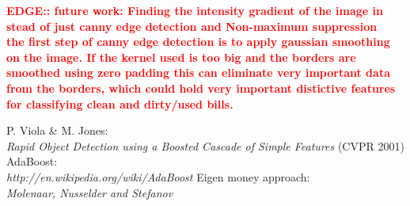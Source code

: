\documentclass[11pt,twocolumn]{article}
\newcommand{\todo}[1]{\textcolor{red}{\textbf{#1}}}
\newcommand{\tit}{\textit}
\begin{document}
		\todo{EDGE::  future work: Finding the intensity gradient of the image in
		stead of just canny edge detection and Non-maximum suppression\\
		the first step of canny edge detection is to apply gaussian smoothing on the
		image. If the kernel used is too big and the borders are smoothed using zero
		padding this can eliminate very important data from the borders, which could
		hold very important distictive features for classifying clean and dirty/used
		bills.}
		
		 
		\begin{thebibliography}{3} 
				P. Viola \& M. Jones:\\
				\tit{Rapid Object Detection using a Boosted Cascade of Simple Features}
				(CVPR 2001)
				AdaBoost: \\
				\tit{http://en.wikipedia.org/wiki/AdaBoost}	
			Eigen money approach: \\
				\tit{Molenaar, Nusselder and Stefanov}	
		\end{thebibliography}
\end{document}
